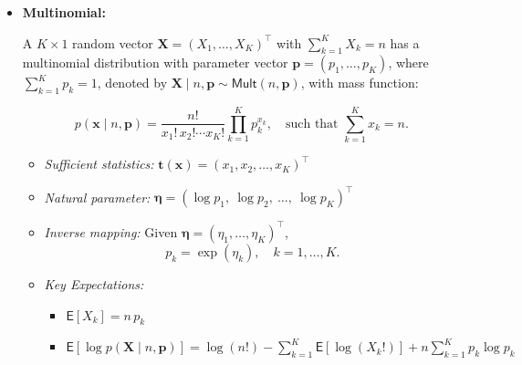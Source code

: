 \begin{appendix}
\begin{itemize}
\begin{itemize}
\item \textit{Sufficient statistics:} $\bm{t}(\bm{x}) = \left([x = 1 ], \dots, [x = K]\right)^\top$\footnote{The Inversion Bracket $[\cdot]$:
\[
[x=k]=\begin{cases}
1, & \text{if } x=k\\
0, & \text{otherwise }
\end{cases}
\]}
\item \textit{Natural parameter:}  $\bm{\eta}=(\log p_1,\cdots,\log p_k)^\top$
\item \textit{Inverse mapping:} Given $\bm{\eta} = (\eta_1,\dots,\eta_K)^\top$, 
$$
p_k = \exp(\eta_k), \quad k=1,\dots,K.
$$
\item \textit{Key Expectations:} 
\begin{itemize}
\item  $\mathsf{E}[X_k] = p_k$
\item $\mathsf{E}[\log p(\bm{X} \mid \bm{p})] = \sum_{k=1}^{K}p_k\log p_k $
\end{itemize}
\end{itemize}

\newpage

\item \textbf{Multinomial:}

A $K \times 1$ random vector $\bm{X} = (X_1, \dots, X_K)^\top$ with $\sum_{k=1}^{K} X_k = n$ has a multinomial distribution with parameter vector $\bm{p} = (p_1, \dots, p_K)$, where $\sum_{k=1}^{K} p_k = 1$, denoted by $\bm{X}\mid n,\bm{p} \sim \mathsf{Mult}(n,\bm{p})$, with mass function:

$$
p(\bm{x} \mid n, \bm{p}) = \frac{n!}{x_1!\,x_2!\cdots x_K!}\prod_{k=1}^{K} p_k^{x_k}, \quad \text{such that } \sum_{k=1}^{K} x_k = n.
$$

\begin{itemize}
\item \textit{Sufficient statistics:} $\bm{t}(\bm{x}) = \left(x_1, x_2, \dots, x_K\right)^\top$
\item \textit{Natural parameter:}  $\bm{\eta} = \left(\log p_1,\ \log p_2,\ \dots,\ \log p_K \right)^\top$
\item \textit{Inverse mapping:} Given $\bm{\eta} = (\eta_1,\dots,\eta_K)^\top$, 
$$
p_k = \exp(\eta_k), \quad k=1,\dots,K.
$$
\item \textit{Key Expectations:} 
\begin{itemize}
\item $\mathsf{E}[X_k] = n\,p_k$
\item $\mathsf{E}[\log p(\bm{X} \mid n,\bm{p})] = \log(n!) - \sum_{k=1}^{K}\mathsf{E}[\log(X_k!)] + n\sum_{k=1}^{K} p_k \log p_k$
\end{itemize}
\end{itemize}
\end{itemize}


\end{appendix}

